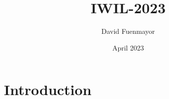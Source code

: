 \documentclass{article}
\title{IWIL-2023}
\author{David Fuenmayor}
\date{April 2023}
\begin{document}
\maketitle

\section{Introduction}
\end{document}
